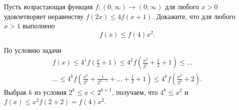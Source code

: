 \problem
Пусть возрастающая функция $f \colon (0; \infty) \to (0; \infty)$ для любого
$x > 0$ удовлетворяет неравенству $f(2 x) \leq  4 f(x + 1)$.
Докажите, что для любого $x > 1$ выполнено
\[
    f(x) \leq f(4) x^2
.\]

\solution
По условию задачи
\begin{gather*}
    f(x)
\leq
    4^1 f\left(\frac{x}{2} + 1 \right)
\leq
    4^2 f\left(\frac{x^2}{2^2} + \frac{1}{2} + 1\right)
\leq\ldots\\\ldots\leq
    4^k f\left(
        \frac{x^k}{2^k} + \frac{1}{2^{k-1}} + \ldots + \frac{1}{2} + 1
    \right)
\leq
    4^k f\left(\frac{x^k}{2^k} + 2\right)
.\end{gather*}
Выбрав $k$ из условия $2^k \leq x < 2^{k + 1}$, получаем, что $4^k \leq x^2$ и
$f(x) \leq x^2 f(2 + 2) = f(4) x^2$.
\endproblem
